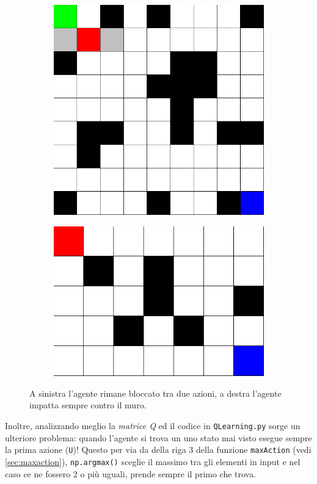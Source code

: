 \begin{figure}[H]
	\centering
	\begin{subfigure}{.5\textwidth}
		\centering
		\includegraphics[width=.7\linewidth]{img/primo_allenamento_agente.png}
	\end{subfigure}%
	\begin{subfigure}{.5\textwidth}
		\centering
		\includegraphics[width=.8\linewidth]{img/primo_allenamento_rotto.png}
	\end{subfigure}%
	\caption{A sinistra l'agente rimane bloccato tra due azioni, a destra l'agente impatta sempre contro il muro.}
\end{figure}

Inoltre, analizzando meglio la \textit{matrice Q} ed il codice in \lstinline[style=cmd]|QLearning.py| sorge un ulteriore problema: quando l'agente si trova un uno stato mai visto esegue sempre la prima azione (\lstinline[style=cmd]|U|)! Questo per via da della riga 3 della funzione \lstinline[style=cmd]|maxAction| (vedi \autoref{sec:maxaction}), \lstinline[style=cmd]|np.argmax()| sceglie il massimo tra gli elementi in input e nel caso ce ne fossero 2 o pi\`{u} uguali, prende sempre il primo che trova.

